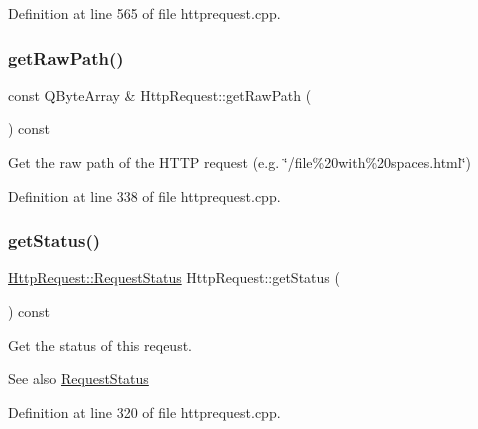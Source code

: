 Definition at line 565 of file httprequest.\+cpp.

\mbox{\label{classstefanfrings_1_1_http_request_ad472e46e79a5bfc676f5670f3655009b}} 
\subsubsection{\texorpdfstring{get\+Raw\+Path()}{getRawPath()}}
{\footnotesize\ttfamily const Q\+Byte\+Array \& Http\+Request\+::get\+Raw\+Path (\begin{DoxyParamCaption}{ }\end{DoxyParamCaption}) const}

Get the raw path of the H\+T\+TP request (e.\+g. \char`\"{}/file\%20with\%20spaces.\+html\char`\"{}) 

Definition at line 338 of file httprequest.\+cpp.

\mbox{\label{classstefanfrings_1_1_http_request_a1e53a0d5566400eae00e47b819a26c30}} 
\subsubsection{\texorpdfstring{get\+Status()}{getStatus()}}
{\footnotesize\ttfamily \mbox{\hyperlink{classstefanfrings_1_1_http_request_a45b0d7b99dbbb1b2c62afd8f51887995}{Http\+Request\+::\+Request\+Status}} Http\+Request\+::get\+Status (\begin{DoxyParamCaption}{ }\end{DoxyParamCaption}) const}

Get the status of this reqeust. \begin{DoxySeeAlso}{See also}
\mbox{\hyperlink{classstefanfrings_1_1_http_request_a45b0d7b99dbbb1b2c62afd8f51887995}{Request\+Status}} 
\end{DoxySeeAlso}


Definition at line 320 of file httprequest.\+cpp.

\mbox{\label{classstefanfrings_1_1_http_request_ac85c0bf7867adf6145902c51d4bc4701}} 
